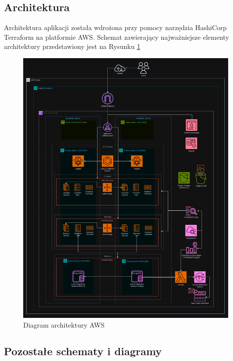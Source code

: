 \documentclass[../main.tex]{subfiles}
\begin{document}
    \subsection{Architektura}
        Architektura aplikacji została wdrożona przy pomocy narzędzia HashiCorp Terraform na platformie AWS. Schemat zawierający najważniejsze elementy architektury przedstawiony jest na Rysunku \ref{fig:aws-architecture} 
        \begin{figure}[!ht]
            \centering
            \includegraphics[width=1.0\linewidth]{images/AWS-diagram.png}
            \caption{Diagram architektury AWS}
            \label{fig:aws-architecture}
        \end{figure}

    \subsection{Pozostałe schematy i diagramy}
\end{document}
